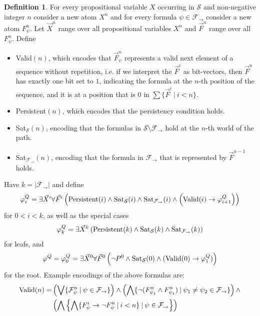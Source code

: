 \documentclass[a4paper,11pt]{report}
\theoremstyle{definition}
\theoremstyle{definition}
\theoremstyle{definition}
\theoremstyle{definition}
\theoremstyle{definition}
\newtheorem{definition}[theorem]{Definition}
\theoremstyle{definition}
\theoremstyle{definition}
\begin{document}
	\begin{definition}
		For every propositional variable $X$ occurring in $\mathcal S$ and non-negative integer $n$ consider a new atom $X^n$ and for every formula $\psi\in\mathcal F_\to$ consider a new atom $F_\psi^n$. Let $\vec X^n$ range over all propositional variables $X^n$ and $\vec F^n$ range over all $F_\psi^n$. Define
		\begin{itemize}
			\item {\normalfont Valid}$(n)$, which encodes that $\vec F^n_\psi$ represents a valid next element of a sequence without repetition, i.e. if we interpret the $\vec F^i$ as bit-vectors, then $\vec F^n$ has exactly one bit set to $1$, indicating the formula at the $n$-th position of the sequence, and it is at a position that is $0$ in $\sum\{\vec F^i\:|\:i < n\}$.
			\item {\normalfont Persistent}$(n)$, which encodes that the persistency condition holds.
			\item {\normalfont Sat}$_{\mathcal S}(n)$, encoding that the formulas in $\mathcal S\setminus\mathcal F_\to$ hold at the $n$-th world of the path.
			\item {\normalfont Sat}$_{\mathcal F_\to}(n)$, encoding that the formula in $\mathcal F_\to$ that is represented by $\vec F^{n-1}$ holds.
		\end{itemize}
		Have $k = |\mathcal F_\to|$ and define$$\varphi^Q_{i} = \exists \vec X^i\forall \vec F^i\left(\text{\normalfont Persistent}(i)\wedge \text{\normalfont Sat}_{\mathcal S}(i)\wedge \text{\normalfont Sat}_{\mathcal F_\to}(i)\wedge\left(\text{\normalfont Valid}(i)\to \varphi^Q_{i+1}\right)\right)$$
		for $0 < i < k$, as well as the special cases
		$$\varphi^Q_{k} = \exists \vec X^k\left(\text{\normalfont Persistent}(k)\wedge \text{\normalfont Sat}_{\mathcal S}(k)\wedge \text{\normalfont Sat}_{\mathcal F_\to}(k)\right)$$
		for leafs, and $$\varphi^Q = \varphi_0^Q = \exists \vec X^0\forall \vec F^0\left(\neg P^0\wedge \text{\normalfont Sat}_{\mathcal S}(0)\wedge(\text{\normalfont Valid}(0)\to \varphi_1^Q)\right)$$for the root.
		Example encodings of the above formulas are:
		\begin{align*}
			\text{\normalfont Valid}(n) = &\left(\bigvee \{\mathcal F^n_\psi\:|\:\psi\in\mathcal F_\to\}\right)\wedge\left(\bigwedge \{\neg(F^n_{\psi_1}\wedge F^n_{\psi_1})\:|\:\psi_1\neq\psi_2\in\mathcal F_\to\}\right)\wedge\\&\left(\bigwedge\left\{\bigwedge\{F^i_\psi\to\neg F^n_\psi\:|\:i < n\}\:|\:\psi\in\mathcal F_\to\right\}\right)\\

\end{align*}
\end{definition}
\end{document}
